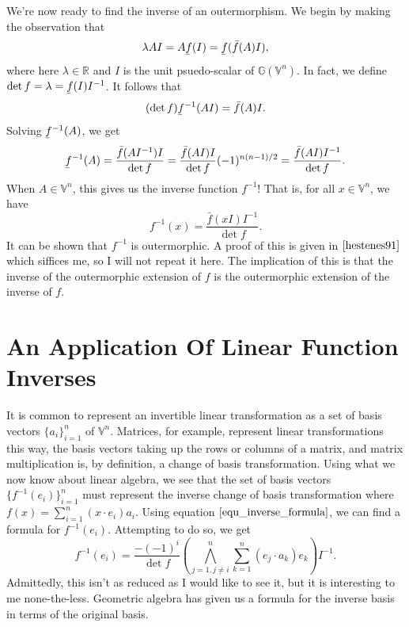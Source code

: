 \documentclass[12pt]{article}
\newcommand{\G}{\mathbb{G}}
\newcommand{\V}{\mathbb{V}}
\newcommand{\R}{\mathbb{R}}
\newcommand{\uf}{\underaccent{\bar}{f}}
\newcommand{\of}{\bar{f}}
\begin{document}
We're now ready to find the inverse of an outermorphism.  We begin by making the
observation that
\begin{equation*}
\lambda AI = A\uf(I) = \uf(\of(A)I),
\end{equation*}
where here $\lambda\in\R$ and $I$ is the unit psuedo-scalar of $\G(\V^n)$.
In fact, we define $\det f=\lambda = \uf(I)I^{-1}$.  It follows that
\begin{equation*}
(\det f)\uf^{-1}(AI) = \of(A)I.
\end{equation*}
Solving $\uf^{-1}(A)$, we get
\begin{equation*}
\uf^{-1}(A) = \frac{\of(AI^{-1})I}{\det f} = \frac{\of(AI)I}{\det f}(-1)^{n(n-1)/2} = \frac{\of(AI)I^{-1}}{\det f}.
\end{equation*}
When $A\in\V^n$, this gives us the inverse function $f^{-1}$!  That is, for all $x\in\V^n$,
we have
\begin{equation}\label{equ_inverse_formula}
f^{-1}(x) = \frac{\of(xI)I^{-1}}{\det f}.
\end{equation}
It can be shown that $f^{-1}$ is outermorphic.
A proof of this is given in $\cite{hestenes91}$ which siffices me, so I will
not repeat it here.
The implication of this is that the inverse of the outermorphic
extension of $f$ is the outermorphic extension of the inverse of $f$.

\section{An Application Of Linear Function Inverses}

It is common to represent an invertible linear transformation as a set of basis vectors $\{a_i\}_{i=1}^n$ of $\V^n$.
Matrices, for example, represent linear transformations this way, the basis vectors taking up the rows or
columns of a matrix, and matrix multiplication is, by definition, a
change of basis transformation.  Using what we now know about linear algebra, we see that
the set of basis vectors $\{f^{-1}(e_i)\}_{i=1}^n$ must represent the inverse change of basis transformation
where $f(x)=\sum_{i=1}^n (x\cdot e_i)a_i$.  Using equation $\eqref{equ_inverse_formula}$, we can find
a formula for $f^{-1}(e_i)$.
Attempting to do so, we get
\begin{equation*}
f^{-1}(e_i) = \frac{-(-1)^i}{\det f}\left(\bigwedge_{j=1,j\neq i}^n\sum_{k=1}^n (e_j\cdot a_k)e_k\right)I^{-1}.
\end{equation*}
Admittedly, this isn't as reduced as I would like to see it, but it is interesting to me none-the-less.  Geometric algebra
has given us a formula for the inverse basis in terms of the original basis.
\end{document}
